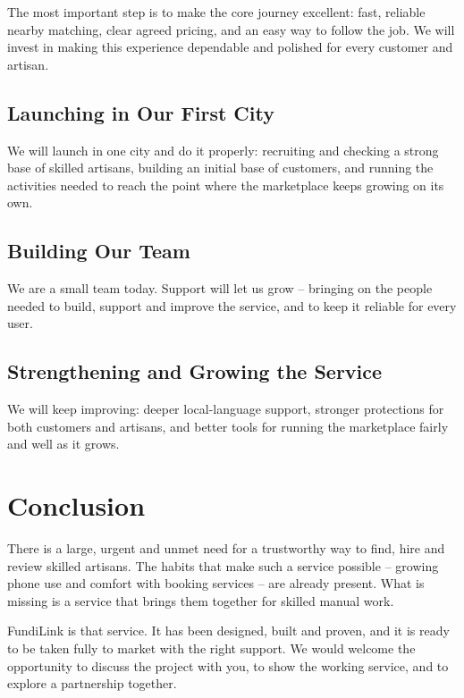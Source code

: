 \documentclass[11pt,a4paper]{article}
\begin{document}
The most important step is to make the core journey excellent: fast, reliable nearby matching,
clear agreed pricing, and an easy way to follow the job. We will invest in making this
experience dependable and polished for every customer and artisan.

\subsection{Launching in Our First City}

We will launch in one city and do it properly: recruiting and checking a strong base of
skilled artisans, building an initial base of customers, and running the activities needed to
reach the point where the marketplace keeps growing on its own.

\subsection{Building Our Team}

We are a small team today. Support will let us grow -- bringing on the people needed to build,
support and improve the service, and to keep it reliable for every user.

\subsection{Strengthening and Growing the Service}

We will keep improving: deeper local-language support, stronger protections for both customers
and artisans, and better tools for running the marketplace fairly and well as it grows.

\section{Conclusion}

There is a large, urgent and unmet need for a trustworthy way to find, hire and review skilled
artisans. The habits that make such a service possible -- growing phone use and comfort with
booking services -- are already present. What is missing is a service that brings them
together for skilled manual work.

FundiLink is that service. It has been designed, built and proven, and it is ready to be taken
fully to market with the right support. We would welcome the opportunity to discuss the
project with you, to show the working service, and to explore a partnership together.
\end{document}
